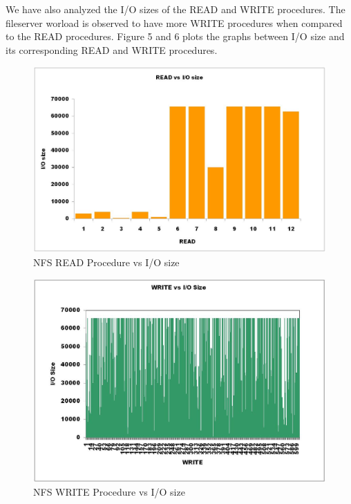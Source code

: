 \documentclass[conference]{IEEEtran}
\begin{document}
We have also analyzed the I/O sizes of the READ and WRITE procedures. The fileserver worload is observed to have more WRITE procedures when compared to the READ procedures. Figure 5 and 6 plots the graphs between I/O size and its corresponding READ and WRITE procedures. 
\noindent
\begin{figure}[htb]
\centering
\includegraphics[width=\linewidth]{read_io.jpg}
\caption{NFS READ Procedure vs I/O size}
\label{fig:awesome_image}
\end{figure}


\noindent
\begin{figure}[htb]
\centering
\includegraphics[width=\linewidth]{write_io.jpg}
\caption{NFS WRITE Procedure vs I/O size}
\label{fig:awesome_image}
\end{figure}
\noindent
\end{document}
